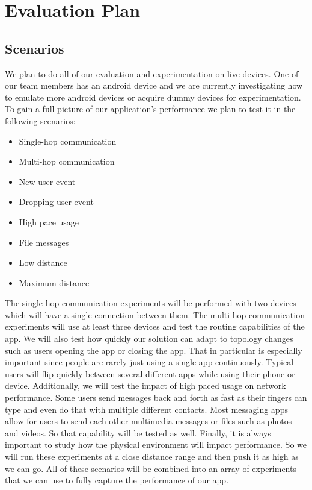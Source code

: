 \documentclass[10pt]{article}
\begin{document}
\section{Evaluation Plan}
\subsection{Scenarios}

We plan to do all of our evaluation and experimentation on live devices. One of our team members has an android device and we are currently investigating how to emulate more android devices or acquire dummy devices for experimentation. To gain a full picture of our application's performance we plan to test it in the following scenarios:

\begin{itemize}
    \item Single-hop communication
    \item Multi-hop communication
    \item New user event
    \item Dropping user event
    \item High pace usage
    \item File messages
    \item Low distance
    \item Maximum distance
\end{itemize}

The single-hop communication experiments will be performed with two devices which will have a single connection between them. The multi-hop communication experiments will use at least three devices and test the routing capabilities of the app. We will also test how quickly our solution can adapt to topology changes such as users opening the app or closing the app. That in particular is especially important since people are rarely just using a single app continuously. Typical users will flip quickly between several different apps while using their phone or device. Additionally, we will test the impact of high paced usage on network performance. Some users send messages back and forth as fast as their fingers can type and even do that with multiple different contacts. Most messaging apps allow for users to send each other multimedia messages or files such as photos and videos. So that capability will be tested as well. Finally, it is always important to study how the physical environment will impact performance. So we will run these experiments at a close distance range and then push it as high as we can go. All of these scenarios will be combined into an array of experiments that we can use to fully capture the performance of our app.
\end{document}

